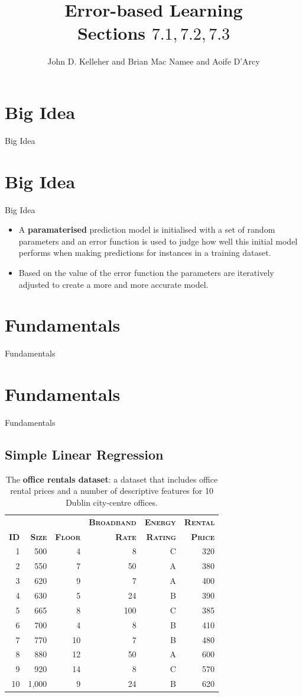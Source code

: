 \documentclass[xcolor={table}]{beamer}
\title{Error-based Learning\\Sections $7.1, 7.2, 7.3$}
\author{John D. Kelleher and Brian Mac Namee and Aoife D'Arcy}
\institute{}
\date{}
\newcommand{\SectionSlideShortHeader}[3][]{
	\ifthenelse{\isempty{#1}}
		{\section[#3]{#2}\begin{frame} \begin{center}\begin{huge}#2\end{huge}\end{center}\end{frame}}
		{\section[#1]{#2}\begin{frame} \begin{center}\begin{huge}#3\end{huge}\end{center}\end{frame}}
}
\newcommand{\indexkeyword}[1]{\alert{\textbf{#1}\index{#1}}}
\newcommand{\featN}[1]{\textsc{#1}}
\begin{document}
\begin{frame}
	\titlepage
\end{frame}
\begin{frame}
	 \tableofcontents
\end{frame}

\SectionSlideShortHeader{Big Idea}{Big Idea}
 
 
\begin{frame} 
\begin{itemize}
\item A \indexkeyword{paramaterised} prediction model is initialised with a set of random parameters and an error function is used to judge how well this initial model performs when making predictions for instances in a training dataset. 
\item Based on the value of the error function the parameters are iteratively adjusted to create a more and more accurate model. 
\end{itemize}
\end{frame} 
 
\SectionSlideShortHeader{Fundamentals}{Fundamentals}

\subsection{Simple Linear Regression}

 \begin{frame} 
\begin{table}
	\caption{The \textbf{office rentals dataset}: a dataset that includes office rental prices and a number of descriptive features for 10 Dublin city-centre offices.}
	\centering
	\begin{footnotesize}
	\begin{tabular}{r r r r r r }
		\hline
				\textbf{}	 & \textbf{}	 & \textbf{} & \textbf{\featN{Broadband}} & \textbf{\featN{Energy}} & \textbf{\featN{Rental}} \\
		\textbf{\featN{ID}}	 & \textbf{\featN{Size}}	 & \textbf{\featN{Floor}} & \textbf{\featN{Rate}} & \textbf{\featN{Rating}} & \textbf{\featN{Price}} \\
		\hline
1 & 500	&	4	&	8	&	C	&	320	\\
2 & 550	&	7	&	50	&	A	&	380	\\
3 & 620	&	9	&	7	&	A	&	400	\\
4 & 630	&	5	&	24	&	B	&	390	\\
5 & 665	&	8	&	100	&	C	&	385	\\
6 & 700	&	4	&	8	&	B	&	410	\\
7 & 770	&	10	&	7	&	B	&	480	\\
8 & 880	&	12	&	50	&	A	&	600	\\
9 & 920	&	14	&	8	&	C	&	570	\\
10 & 1,000	&	9	&	24	&	B	&	620	\\
		\hline
	\end{tabular}
	\end{footnotesize}
\label{tab:officeSizesAndPrices}
\end{table}
\end{frame} 
\end{document}

